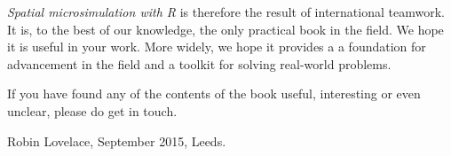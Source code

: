 

\emph{Spatial microsimulation with R} is therefore the
result of international teamwork.
It is, to the best of our knowledge, the only practical book in the
field. We hope it is useful in your work.
More widely, we hope it provides a
a foundation for advancement in the
field and a toolkit for solving real-world problems.

If you have found any of the contents of the book useful, interesting
or even unclear, please do get in touch.

Robin Lovelace, September 2015, Leeds.




% 
% 
% 


